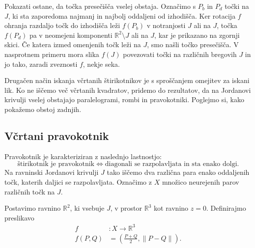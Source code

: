 \documentclass[mat1]{fmfdelo}
\newcommand{\R}{\mathbb R}
\begin{document}
Pokazati ostane, da točka presečišča vselej obstaja. Označimo s $P_b$ in $P_d$ točki na $J$, ki sta zaporedoma najmanj in najbolj oddaljeni od izhodišča. Ker rotacija $f$ ohranja razdaljo točk do izhodišča leži $f(P_b)$ v notranjosti $J$ ali na $J$, točka $f(P_d)$ pa v neomejeni komponenti $\R^2 \setminus J$ ali na $J$, kar je prikazano na zgornji skici. Če katera izmed omenjenih točk leži na $J$, smo našli točko presečišča. V nasprotnem primeru mora slika $f(J)$ povezovati točki na različnih bregovih $J$ in jo tako, zaradi zveznosti $f$, nekje seka.
\endproof

Drugačen način iskanja včrtanih štirikotnikov je s sproščanjem omejitev za iskani lik. Ko ne iščemo več včrtanih kvadratov, pridemo do rezultatov, da na Jordanovi krivulji vselej obstajajo paralelogrami, rombi in pravokotniki. Poglejmo si, kako pokažemo obstoj zadnjih.

\subsection{Včrtani pravokotnik}
Pravokotnik je karakteriziran z naslednjo lastnostjo:
\begin{equation}
\label{prop:pravokotnik}
\text{štirikotnik je pravokotnik} \iff \text{diagonali se razpolavljata in sta enako dolgi}.
\end{equation}
Na ravninski Jordanovi krivulji $J$ tako iščemo dva različna para enako oddaljenih točk, katerih daljici se razpolavljata. Označimo z $X$ množico neurejenih parov različnih točk na $J$.

Postavimo ravnino $\R^2$, ki vsebuje $J$, v prostor $\R^3$ kot ravnino $z = 0$. Definirajmo preslikavo 
\begin{align*}
f &\colon X \to \R^3 \\
f({P, Q}) &= ( \frac{P+Q}{2} , \|P-Q\|).
\end{align*}
\end{document}
